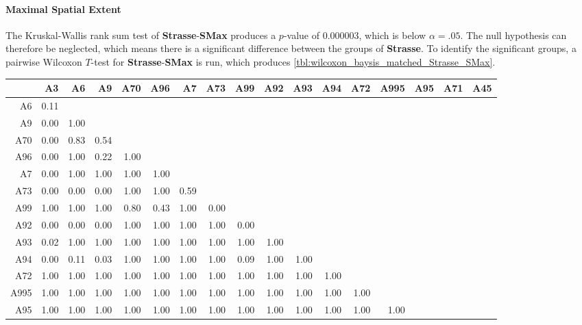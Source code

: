\paragraph{Maximal Spatial Extent}
The Kruskal-Wallis rank sum test of \textbf{Strasse}-\textbf{SMax} produces a $p$-value of 0.000003, which is below $\alpha=.05$. The null hypothesis can therefore be neglected, which means there is a significant difference between the groups of \textbf{Strasse}. To identify the significant groups, a pairwise Wilcoxon $T$-test for \textbf{Strasse}-\textbf{SMax} is run, which produces \autoref{tbl:wilcoxon_baysis_matched_Strasse_SMax}.
\begin{table}[ht]
	\tiny
	\setlength{\tabcolsep}{4pt}
	\centering
	\begin{tabular}{rrrrrrrrrrrrrrrrr}
		\toprule
				& A3   & A6   & A9   & A70  & A96  & A7   & A73   & A99 & A92 & A93 & A94 & A72 & A995 & A95 & A71 & A45 \\ 
		\midrule
		A6 		& 0.11 &  &  &  &  &  &  &  &  &  &  &  &  &  &  &  \\ 
		A9 		& 0.00 & 1.00 &  &  &  &  &  &  &  &  &  &  &  &  &  &  \\ 
		A70 	& 0.00 & 0.83 & 0.54 &  &  &  &  &  &  &  &  &  &  &  &  &  \\ 
		A96 	& 0.00 & 1.00 & 0.22 & 1.00 &  &  &  &  &  &  &  &  &  &  &  &  \\ 
		A7 		& 0.00 & 1.00 & 1.00 & 1.00 & 1.00 &  &  &  &  &  &  &  &  &  &  &  \\ 
		A73 	& 0.00 & 0.00 & 0.00 & 1.00 & 1.00 & 0.59 &  &  &  &  &  &  &  &  &  &  \\ 
		A99 	& 1.00 & 1.00 & 1.00 & 0.80 & 0.43 & 1.00 & 0.00 &  &  &  &  &  &  &  &  &  \\ 
		A92 	& 0.00 & 0.00 & 0.00 & 1.00 & 1.00 & 1.00 & 1.00 & 0.00 &  &  &  &  &  &  &  &  \\ 
		A93 	& 0.02 & 1.00 & 1.00 & 1.00 & 1.00 & 1.00 & 1.00 & 1.00 & 1.00 &  &  &  &  &  &  &  \\ 
		A94 	& 0.00 & 0.11 & 0.03 & 1.00 & 1.00 & 1.00 & 1.00 & 0.09 & 1.00 & 1.00 &  &  &  &  &  &  \\ 
		A72 	& 1.00 & 1.00 & 1.00 & 1.00 & 1.00 & 1.00 & 1.00 & 1.00 & 1.00 & 1.00 & 1.00 &  &  &  &  &  \\ 
		A995 	& 1.00 & 1.00 & 1.00 & 1.00 & 1.00 & 1.00 & 1.00 & 1.00 & 1.00 & 1.00 & 1.00 & 1.00 &  &  &  &  \\ 
		A95 	& 1.00 & 1.00 & 1.00 & 1.00 & 1.00 & 1.00 & 1.00 & 1.00 & 1.00 & 1.00 & 1.00 & 1.00 & 1.00 &  &  &  \\ 

\end{tabular}
\end{table}
